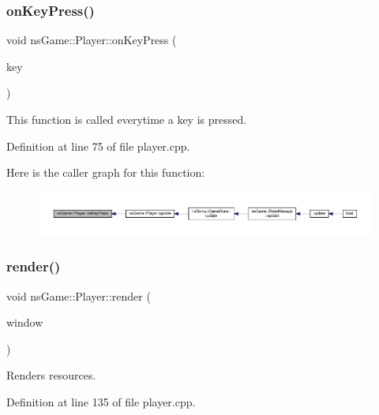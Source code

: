 \subsubsection{\texorpdfstring{on\+Key\+Press()}{onKeyPress()}}
{\footnotesize\ttfamily void ns\+Game\+::\+Player\+::on\+Key\+Press (\begin{DoxyParamCaption}\item[{char}]{key }\end{DoxyParamCaption})}



This function is called everytime a key is pressed. 



Definition at line 75 of file player.\+cpp.

Here is the caller graph for this function\+:\nopagebreak
\begin{figure}[H]
\begin{center}
\leavevmode
\includegraphics[width=350pt]{classns_game_1_1_player_a6633913bc19fdca8616b29ee265f7b28_icgraph}
\end{center}
\end{figure}
\mbox{\label{classns_game_1_1_player_a34b359a72d3dbdf537c72161898376f3}} 
\subsubsection{\texorpdfstring{render()}{render()}}
{\footnotesize\ttfamily void ns\+Game\+::\+Player\+::render (\begin{DoxyParamCaption}\item[{Min\+GL \&}]{window }\end{DoxyParamCaption})}



Renders resources. 



Definition at line 135 of file player.\+cpp.

